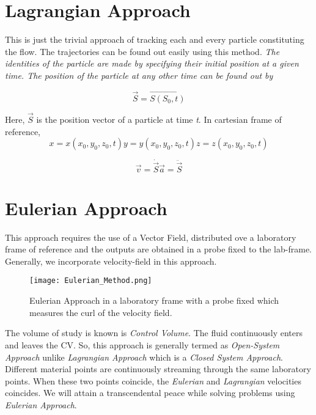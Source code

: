 \documentclass{book}
\begin{document}
\section{Lagrangian Approach}
This is just the trivial approach of tracking each and every particle constituting the flow. The trajectories can be found out easily using this method. \emph{The identities of the particle are made by specifying their initial position at a given time. The position of the particle at any other time can be found out by}
\begin{center}
\begin{equation}
\vec{S}=\vec{S(S_0,t)}
\end{equation}
\end{center}
Here, $\vec{S}$ is the position vector of a particle at time \emph{t}. In cartesian frame of reference, 
\begin{subequations}
\begin{equation}
x=x(x_0,y_0,z_0,t)
\end{equation}
\begin{equation}
y=y(x_0,y_0,z_0,t)
\end{equation}
\begin{equation}
z=z(x_0,y_0,z_0,t)
\end{equation}
\end{subequations}



\begin{subequations}
\begin{equation}
\vec{v}=\dot{\vec{S}}
\end{equation}
\begin{equation}
\vec{a}=\ddot{\vec{S}}
\end{equation}

\end{subequations}

\section{Eulerian Approach}
This approach requires the use of a Vector Field, distributed ove a laboratory frame of reference and the outputs are obtained in a probe fixed to the lab-frame. Generally, we incorporate velocity-field in this approach.
\begin{figure}[h]
\texttt{[image: Eulerian\_Method.png]}
\caption{Eulerian Approach in a laboratory frame with a probe fixed which measures the curl of the velocity field.}
\end{figure}
The volume of study is known is \emph{Control Volume}. The fluid continuously enters and leaves the CV. So, this approach is generally termed as \emph{Open-System Approach} unlike \emph{Lagrangian Approach} which is a \emph{Closed System Approach}. Different material points are continuously streaming through the same laboratory points. When these two points coincide, the \emph{Eulerian} and \emph{Lagrangian} velocities coincides. We will attain a transcendental peace while solving problems using \emph{Eulerian Approach}.
\end{document}
